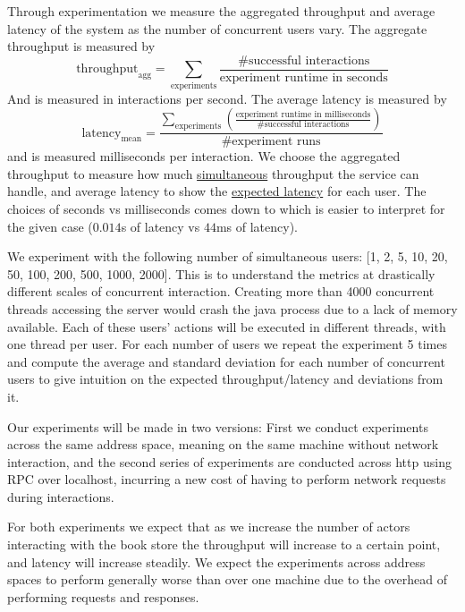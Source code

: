 \documentclass{article}
\newcommand{\paren}[1]{\left(#1\right)}
\begin{document}
Through experimentation we measure the aggregated throughput and average latency of the system as the number of concurrent users vary. The aggregate throughput is measured by
\begin{equation}
	\text{throughput}_\text{agg}=\sum_{\text{experiments}}\frac{\text{\# successful interactions}}{\text{experiment runtime in seconds}}
\end{equation}
And is measured in interactions per second. The average latency is measured by
\begin{equation}
	\text{latency}_\text{mean}=\frac{\sum_{\text{experiments}}\paren{\frac{\text{experiment runtime in milliseconds}}{\text{\# successful interactions}}}}{\text{\# experiment runs}}
\end{equation}
and is measured milliseconds per interaction. We choose the aggregated throughput to measure how much \underline{simultaneous} throughput the service can handle, and average latency to show the \underline{expected latency} for each user. The choices of seconds vs milliseconds comes down to which is easier to interpret for the given case ($0.014$s of latency vs $44$ms of latency).

We experiment with the following number of simultaneous users: [1, 2, 5, 10, 20, 50, 100, 200, 500, 1000, 2000]. This is to understand the metrics at drastically different scales of concurrent interaction. Creating more than 4000 concurrent threads accessing the server would crash the java process due to a lack of memory available. Each of these users' actions will be executed in different threads, with one thread per user. For each number of users we repeat the experiment 5 times and compute the average and standard deviation for each number of concurrent users to give intuition on the expected throughput/latency and deviations from it.

Our experiments will be made in two versions: First we conduct experiments across the same address space, meaning on the same machine without network interaction, and the second series of experiments are conducted across http using RPC over localhost, incurring a new cost of having to perform network requests during interactions. 

For both experiments we expect that as we increase the number of actors interacting with the book store the throughput will increase to a certain point, and latency will increase steadily. We expect the experiments across address spaces to perform generally worse than over one machine due to the overhead of performing requests and responses.
\end{document}
